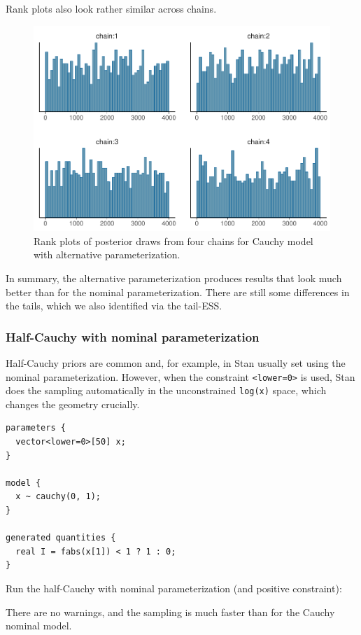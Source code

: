 \documentclass[american,]{article}
\begin{document}
Rank plots also look rather similar across chains.

\begin{figure}[t]
  \centering
  \includegraphics[width=0.6\linewidth]{graphics/hist-fit-alt1-1.pdf}
  \caption{Rank plots of posterior draws from four chains for Cauchy model with alternative parameterization.}
\end{figure}

In summary, the alternative parameterization produces results that look
much better than for the nominal parameterization. There are still some
differences in the tails, which we also identified via the tail-ESS.

\hypertarget{half-cauchy-with-nominal-parameterization}{%
\subsubsection{Half-Cauchy with nominal
parameterization}\label{half-cauchy-with-nominal-parameterization}}

Half-Cauchy priors are common and, for example, in Stan usually set
using the nominal parameterization. However, when the constraint
\texttt{\textless{}lower=0\textgreater{}} is used, Stan does the
sampling automatically in the unconstrained \texttt{log(x)} space, which
changes the geometry crucially.

\begin{verbatim}
parameters {
  vector<lower=0>[50] x;
}

model {
  x ~ cauchy(0, 1);
}

generated quantities {
  real I = fabs(x[1]) < 1 ? 1 : 0;
}
\end{verbatim}

Run the half-Cauchy with nominal parameterization (and positive
constraint):

There are no warnings, and the sampling is much faster than for the
Cauchy nominal model.
\end{document}
